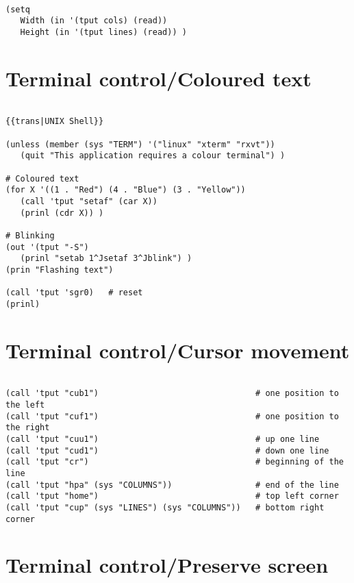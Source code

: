\begin{verbatim}

(setq
   Width (in '(tput cols) (read))
   Height (in '(tput lines) (read)) )

\end{verbatim}

\section*{Terminal control/Coloured text}

\begin{verbatim}

{{trans|UNIX Shell}}

(unless (member (sys "TERM") '("linux" "xterm" "rxvt"))
   (quit "This application requires a colour terminal") )

# Coloured text
(for X '((1 . "Red") (4 . "Blue") (3 . "Yellow"))
   (call 'tput "setaf" (car X))
   (prinl (cdr X)) )

# Blinking
(out '(tput "-S")
   (prinl "setab 1^Jsetaf 3^Jblink") )
(prin "Flashing text")

(call 'tput 'sgr0)   # reset
(prinl)

\end{verbatim}

\section*{Terminal control/Cursor movement}

\begin{verbatim}

(call 'tput "cub1")                                # one position to the left
(call 'tput "cuf1")                                # one position to the right
(call 'tput "cuu1")                                # up one line
(call 'tput "cud1")                                # down one line
(call 'tput "cr")                                  # beginning of the line
(call 'tput "hpa" (sys "COLUMNS"))                 # end of the line
(call 'tput "home")                                # top left corner
(call 'tput "cup" (sys "LINES") (sys "COLUMNS"))   # bottom right corner

\end{verbatim}

\section*{Terminal control/Preserve screen}

